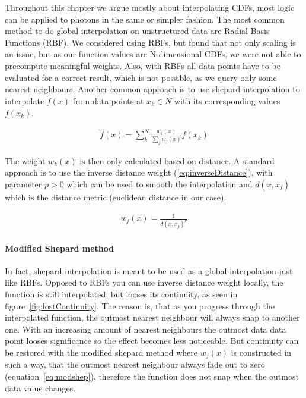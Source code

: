 Throughout this chapter we argue mostly about interpolating CDFs, most logic can be applied to photons in the same or simpler fashion. The most common method to do global interpolation on unstructured data are Radial Basis Functions (RBF). We considered using RBFs, but found that not only scaling is an issue, but as our function values are N-dimensional CDFs, we were not able to precompute meaningful weights. Also, with RBFs all data points have to be evaluated for a correct result, which is not possible, as we query only some nearest neighbours. Another common approach is to use shepard interpolation to interpolate $\widetilde{f}(x)$ from data points at $x_k \in N$ with its corresponding values $f(x_k)$. 

\begin{align}\label{eq:shepard}
\widetilde{f}(x) = \sum_{k}^{N}\frac{w_k(x)}{\sum\nolimits_{j}w_j(x)}f(x_k)
\end{align}

The weight $w_k(x)$ is then only calculated based on distance. A standard approach is to use the inverse distance weight (\ref{eq:inverseDistance}), with parameter $p > 0$ which can be used to smooth the interpolation and $d(x, x_j)$ which is the distance metric (euclidean distance in our case).

\begin{align}\label{eq:inverseDistance}
w_j(x) = \frac{1}{d(x, x_j)^p}
\end{align}

\paragraph{Modified Shepard method}

In fact, shepard interpolation is meant to be used as a global interpolation just like RBFs. Opposed to RBFs you can use inverse distance weight locally, the function is still interpolated, but looses its continuity, as seen in figure~\ref{fig:lostContinuity}. The reason is, that as you progress through the interpolated function, the outmost nearest neighbour will always snap to another one. With an increasing amount of nearest neighbours the outmost data data point looses significance so the effect becomes less noticeable. But continuity can be restored with the modified shepard method  where $w_j(x)$ is constructed in such a way, that the outmost nearest neighbour always fade out to zero (equation~\ref{eq:modshep}), therefore the function does not snap when the outmost data value changes.

